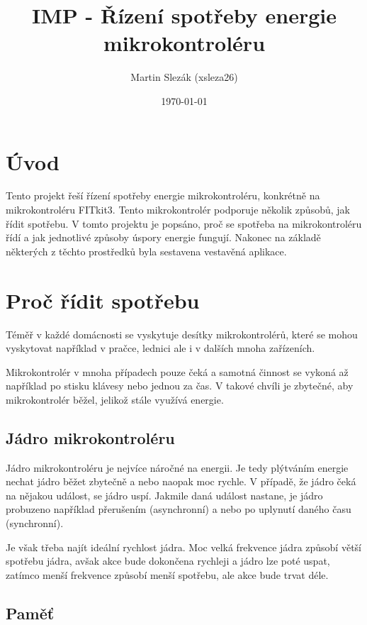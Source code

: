 \documentclass{article}
\title{IMP - Řízení spotřeby energie mikrokontroléru}
\author{Martin Slezák (xsleza26)}
\date{\today}
\begin{document}
\maketitle

\section{Úvod}

Tento projekt řeší řízení spotřeby energie mikrokontroléru, konkrétně na
mikrokontroléru FITkit3. Tento mikrokontrolér podporuje několik způsobů, jak
řídit spotřebu. V tomto projektu je popsáno, proč se spotřeba na
mikrokontroléru řídí a jak jednotlivé způsoby úspory energie fungují. Nakonec
na základě některých z těchto prostředků byla sestavena vestavěná aplikace.

\section{Proč řídit spotřebu}

Téměř v každé domácnosti se vyskytuje desítky mikrokontrolérů, které se mohou
vyskytovat například v pračce, lednici ale i v dalších mnoha zařízeních.

Mikrokontrolér v mnoha případech pouze čeká a samotná činnost se vykoná až
například po stisku klávesy nebo jednou za čas. V takové chvíli je zbytečné,
aby mikrokontrolér běžel, jelikož stále využívá energie.

\subsection*{Jádro mikrokontroléru}

Jádro mikrokontroléru je nejvíce náročné na energii. Je tedy plýtváním energie
nechat jádro běžet zbytečně a nebo naopak moc rychle. V případě, že jádro čeká
na nějakou událost, se jádro uspí. Jakmile daná událost nastane, je jádro
probuzeno například přerušením (asynchronní) a nebo po uplynutí daného času
(synchronní).

Je však třeba najít ideální rychlost jádra. Moc velká frekvence jádra způsobí
větší spotřebu jádra, avšak akce bude dokončena rychleji a jádro lze poté
uspat, zatímco menší frekvence způsobí menší spotřebu, ale akce bude trvat
déle.

\subsection*{Paměť}
\end{document}
